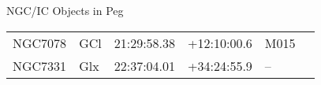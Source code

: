 \begin{block}{NGC/IC Objects in Peg}
  \centering
  \begin{tabularx}{\textwidth}{llrrll} 
    NGC7078 & GCl & 21:29:58.38 & +12:10:00.6  & M015 \\ 
    NGC7331 & Glx & 22:37:04.01 & +34:24:55.9  & -- \\ 
  \end{tabularx}
\end{block}
